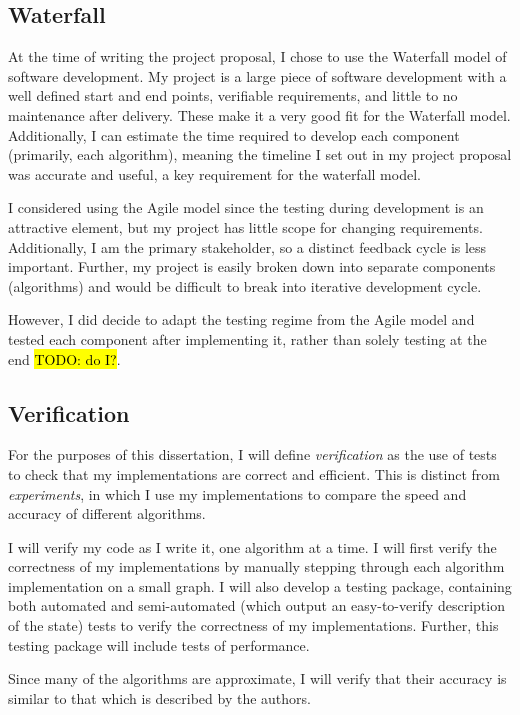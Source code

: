 \documentclass[12pt,a4paper,twoside,openright]{report}
\newcommand{\todo}[1]{\hl{TODO: #1}}
\begin{document}
	\subsection{Waterfall}
	At the time of writing the project proposal, I chose to use the Waterfall model of software development. My project is a large piece of software development with a well defined start and end points, verifiable requirements, and little to no maintenance after delivery. These make it a very good fit for the Waterfall model. Additionally, I can estimate the time required to develop each component (primarily, each algorithm), meaning the timeline I set out in my project proposal was accurate and useful, a key requirement for the waterfall model.
	
	I considered using the Agile model since the testing during development is an attractive element, but my project has little scope for changing requirements. Additionally, I am the primary stakeholder, so a distinct feedback cycle is less important. Further, my project is easily broken down into separate components (algorithms) and would be difficult to break into iterative development cycle.
	
	However, I did decide to adapt the testing regime from the Agile model and tested each component after implementing it, rather than solely testing at the end \todo{do I?}.
	
	\subsection{Verification}
			For the purposes of this dissertation, I will define \textit{verification} as the use of tests to check that my implementations are correct and efficient. This is distinct from \textit{experiments}, in which I use my implementations to compare the speed and accuracy of different algorithms.
			
			I will verify my code as I write it, one algorithm at a time. I will first verify the correctness of my implementations by manually stepping through each algorithm implementation on a small graph. I will also develop a testing package, containing both automated and semi-automated (which output an easy-to-verify description of the state) tests to verify the correctness of my implementations. Further, this testing package will include tests of performance.
			
			Since many of the algorithms are approximate, I will verify that their accuracy is similar to that which is described by the authors.
			
\end{document}
